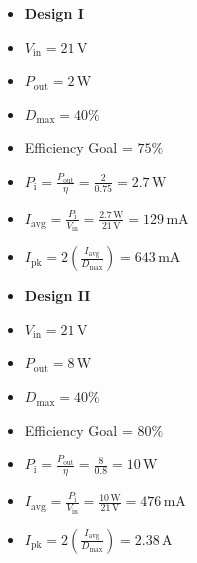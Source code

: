 \documentclass{article}
\begin{document}
\noindent %
\begin{minipage}[t]{0.45\linewidth} %
    \begin{itemize}
        \renewcommand\labelitemi{} %
        \item \textbf{Design I}
        \item \( V_{\text{in}} = 21\, \text{V} \)
        \item \( P_{\text{out}} = 2\, \text{W} \)
        \item \( D_{\text{max}} = 40\% \)
        \item Efficiency Goal = \( 75\% \)
        \item \( P_{\text{i}} = \frac{P_{\text{out}}}{\eta} = \frac{2}{0.75} = 2.7\, \text{W} \)
        \item \( I_{\text{avg}} = \frac{P_{\text{i}}}{V_{\text{in}}} = \frac{2.7\, \text{W}}{21\, \text{V}} = 129\, \text{mA} \)
        \item \( I_{\text{pk}} = 2\left(\frac{I_{\text{avg}}}{D_{\text{max}}}\right) = 643\, \text{mA} \)
    \end{itemize}
\end{minipage}%
\hfill %
\begin{minipage}[t]{0.45\linewidth}
    \begin{itemize}
        \renewcommand\labelitemi{} %
        \item \textbf{Design II}
        \item \( V_{\text{in}} = 21\, \text{V} \)
        \item \( P_{\text{out}} = 8\, \text{W} \)
        \item \( D_{\text{max}} = 40\% \)
        \item Efficiency Goal = \( 80\% \)
        \item \( P_{\text{i}} = \frac{P_{\text{out}}}{\eta} = \frac{8}{0.8} = 10\, \text{W} \)
        \item \( I_{\text{avg}} = \frac{P_{\text{i}}}{V_{\text{in}}} = \frac{10\, \text{W}}{21\, \text{V}} = 476\, \text{mA} \)
        \item \( I_{\text{pk}} = 2\left(\frac{I_{\text{avg}}}{D_{\text{max}}}\right) = 2.38\, \text{A} \)
    \end{itemize}
\end{minipage} \\
\end{document}
